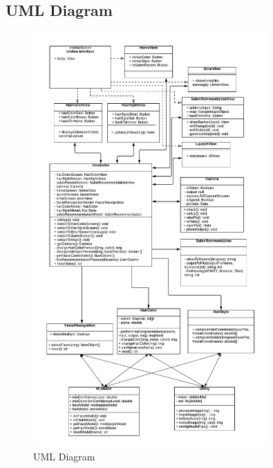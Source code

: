 \documentclass[12pt, titlepage]{article}
\begin{document}
\subsection{UML Diagram}
\begin{center}
\begin{figure}[]
\includegraphics[width=0.8\textwidth, scale=0.8, keepaspectratio]{Design/SoftArchitecture/UML.png}
\caption{UML Diagram}
\label{FigUH} 
\end{figure}
\end{center}



% 
\end{document}
